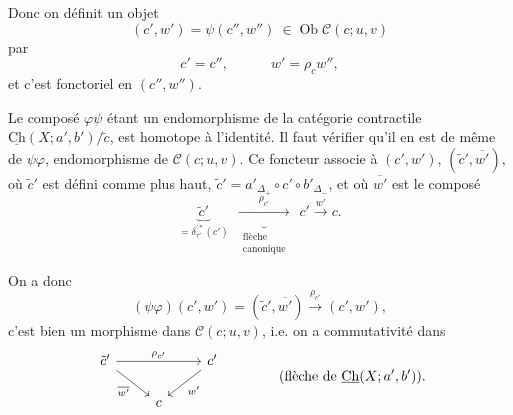 \documentclass[11pt]{article}
\newcommand{\msp}[1]{\marginpar{\footnotesize [#1]}}
\newcommand{\Ch}{\underline{\mathrm{Ch}}}
\newcommand{\cC}{\mathcal{C}}
\newcommand{\Ob}{\operatorname{Ob}}
\begin{document}
\msp{page 165}
Donc on définit un objet
\[
(c',w') = \psi(c'',w'')\ \in \Ob \cC(c;u,v)
\]
par
\[
c' = c'', \qquad\quad w' = \rho_c w'',
\]
et c'est fonctoriel en $(c'',w'')$.

Le composé $\varphi\psi$ étant un endomorphisme de la catégorie contractile $\Ch(X;a',b')/\tilde{c}$, est homotope à l'identité. Il faut vérifier qu'il en est de même de $\psi\varphi$, endomorphisme de $\cC(c;u,v)$. Ce foncteur associe à $(c',w')$, $(\tilde{c}',\overline{w'})$, où $\tilde{c}'$ est défini comme plus haut, $\tilde{c}' = a'_{\Delta_{+}} \circ c' \circ b'_{\Delta_{-}}$, et où $\overline{w'}$ est le composé
\[
\underbrace{\tilde{c}'}_{= \delta^{\prime *}_{\tau'}(c')}\ \ \underbrace{\xrightarrow{\ \rho_{c'}\ }}_{\substack{\text{flèche}\\ \text{canonique}}}\ \ c' \xrightarrow{w'} c.
\]

On a donc
\[
(\psi\varphi)(c',w') = (\tilde{c}',\overline{w'}) \xrightarrow{\rho_{c'}} (c',w'),
\]
c'est bien un morphisme dans $\cC(c;u,v)$, i.e. on a commutativité dans
\[
\begin{tikzcd}
\tilde{c}' \ar[rr,"\rho_{c'}"] \ar[dr,"\overline{w'}"'] & & c' \ar[dl,"w'"] \\
& c &
\end{tikzcd}
\qquad\qquad \text{(flèche de } \Ch(X;a',b')\text{).}
\]
\end{document}
